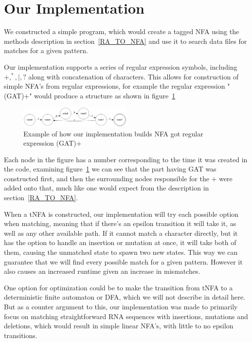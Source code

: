 \section{Our Implementation}
We constructed  a simple program, which would create a tagged NFA using the methods description in section~\ref{RA_TO_NFA} and use it to search data files for matches for a given pattern.

Our implementation supports a series of regular expression symbols, including $+, ^*, |, ?$ along with concatenation of characters. This allows for construction of simple NFA's from regular expressions, for example the regular expression "(GAT)+" would produce a structure as shown in figure~\ref{fig:gat}

\begin{figure}[h!]
\centering
\includegraphics[width=0.5\textwidth]{lib/gat.png}
\caption{Example of how our implementation builds NFA got regular expression (GAT)+}
\label{fig:gat}
\end{figure}

Each node in the figure has a number corresponding to the time it was created in the code, examining figure~\ref{fig:gat} we can see that the part having GAT was constructed first, and then the surrounding nodes responsible for the $+$ were added onto that, much like one would expect from the description in section~\ref{RA_TO_NFA}.

When a tNFA is constructed, our implementation will try each possible option when matching, meaning that if there's an epsilon transition it will take it, as well as any other available path. If it cannot match a character directly, but it has the option to handle an insertion or mutation at once, it will take both of them, causing the unmatched state to spawn two new states. This way we can guarantee that we will find every possible match for a given pattern. However it also causes an increased runtime given an increase in mismatches.

One option for optimization could be to make the transition from tNFA to a deterministic finite automaton or DFA, which we will not describe in detail here. But as a counter argument to this, our implementation was made to primarily focus on matching straightforward RNA sequences with insertions, mutations and deletions, which would result in simple linear NFA's, with little to no epsilon transitions. 